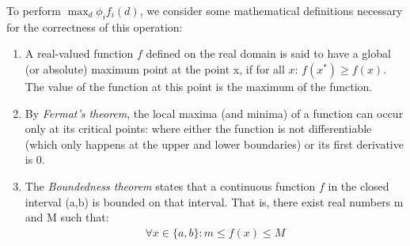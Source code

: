 To perform $\max_d \phi_i f_i(d)$, we consider some mathematical
definitions necessary for the correctness of this operation:
\begin{enumerate}
\item A real-valued function $f$ defined on the real domain is said to
have a global (or absolute) maximum point at the point x, if for all $x$:
$ f(x^{*}) \geq f(x) $. The value of the function at this point is
the maximum of the function.
\item By \emph{Fermat's theorem}, the local maxima (and minima) of a function
can occur only at its critical points: where either the function is not
differentiable (which only happens at the upper and lower boundaries) or its
first derivative is 0.
\item The \emph{Boundedness theorem} states that a continuous function
$f$ in the closed interval (a,b) is bounded on that interval. That is,
there exist real numbers m and M such that:
\begin{align*}
\forall x \in \{a,b\} : m \leq f(x) \leq M 
\end{align*}
\end{enumerate}

